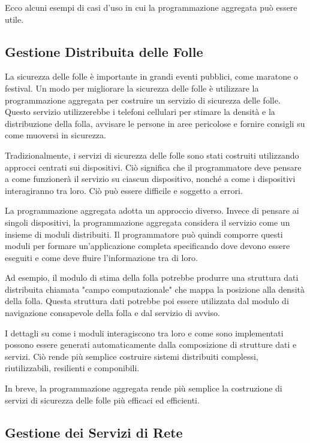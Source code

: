 Ecco alcuni esempi di casi d'uso in cui la programmazione aggregata può essere utile.

\subsection{Gestione Distribuita delle Folle}

La sicurezza delle folle è importante in grandi eventi pubblici, come maratone o festival. Un modo per migliorare la sicurezza delle folle è utilizzare la programmazione aggregata per costruire un servizio di sicurezza delle folle. Questo servizio utilizzerebbe i telefoni cellulari per stimare la densità e la distribuzione della folla, avvisare le persone in aree pericolose e fornire consigli su come muoversi in sicurezza.

Tradizionalmente, i servizi di sicurezza delle folle sono stati costruiti utilizzando approcci centrati sui dispositivi. Ciò significa che il programmatore deve pensare a come funzionerà il servizio su ciascun dispositivo, nonché a come i dispositivi interagiranno tra loro. Ciò può essere difficile e soggetto a errori.

La programmazione aggregata adotta un approccio diverso. Invece di pensare ai singoli dispositivi, la programmazione aggregata considera il servizio come un insieme di moduli distribuiti. Il programmatore può quindi comporre questi moduli per formare un'applicazione completa specificando dove devono essere eseguiti e come deve fluire l'informazione tra di loro.

Ad esempio, il modulo di stima della folla potrebbe produrre una struttura dati distribuita chiamata "campo computazionale" che mappa la posizione alla densità della folla. Questa struttura dati potrebbe poi essere utilizzata dal modulo di navigazione consapevole della folla e dal servizio di avviso.

I dettagli su come i moduli interagiscono tra loro e come sono implementati possono essere generati automaticamente dalla composizione di strutture dati e servizi. Ciò rende più semplice costruire sistemi distribuiti complessi, riutilizzabili, resilienti e componibili.

In breve, la programmazione aggregata rende più semplice la costruzione di servizi di sicurezza delle folle più efficaci ed efficienti.

\subsection{Gestione dei Servizi di Rete}

